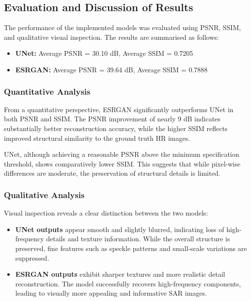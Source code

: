 \documentclass[conference]{IEEEtran}
\begin{document}
\subsection{Evaluation and Discussion of Results}

The performance of the implemented models was evaluated using PSNR, SSIM, and qualitative visual inspection. The results are summarised as follows:

\begin{itemize}
    \item \textbf{UNet:} Average PSNR = 30.10 dB, Average SSIM = 0.7205
    \item \textbf{ESRGAN:} Average PSNR = 39.64 dB, Average SSIM = 0.7888
\end{itemize}

\subsubsection{Quantitative Analysis}

From a quantitative perspective, ESRGAN significantly outperforms UNet in both PSNR and SSIM. The PSNR improvement of nearly 9 dB indicates substantially better reconstruction accuracy, while the higher SSIM reflects improved structural similarity to the ground truth HR images.

UNet, although achieving a reasonable PSNR above the minimum specification threshold, shows comparatively lower SSIM. This suggests that while pixel-wise differences are moderate, the preservation of structural details is limited.

\subsubsection{Qualitative Analysis}

Visual inspection reveals a clear distinction between the two models:

\begin{itemize}
    \item \textbf{UNet outputs} appear smooth and slightly blurred, indicating loss of high-frequency details and texture information. While the overall structure is preserved, fine features such as speckle patterns and small-scale variations are suppressed. 
    \item \textbf{ESRGAN outputs} exhibit sharper textures and more realistic detail reconstruction. The model successfully recovers high-frequency components, leading to visually more appealing and informative SAR images.
\end{itemize}
\end{document}
